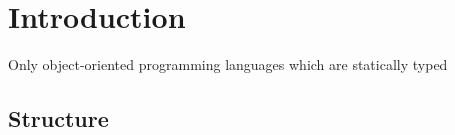 \chapter{Introduction}
Only object-oriented programming languages which are statically typed

\section{Structure}
